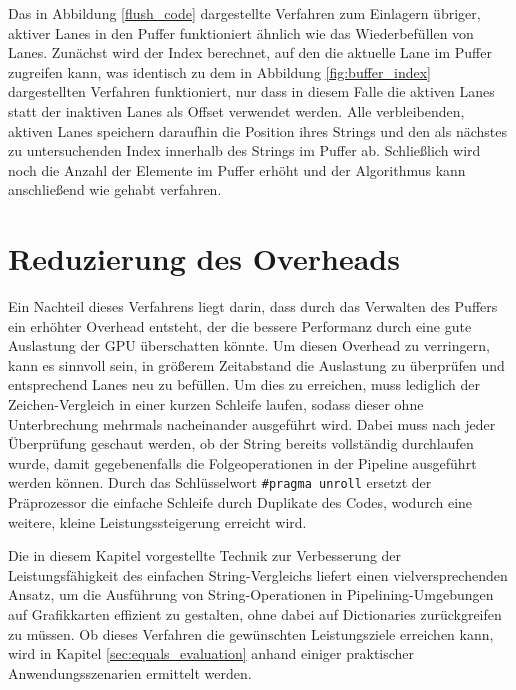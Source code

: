 Das in Abbildung \ref{flush_code} dargestellte Verfahren zum Einlagern übriger, aktiver Lanes in den Puffer funktioniert ähnlich wie das Wiederbefüllen von Lanes.
Zunächst wird der Index berechnet, auf den die aktuelle Lane im Puffer zugreifen kann, was identisch zu dem in Abbildung \ref{fig:buffer_index} dargestellten Verfahren funktioniert, nur dass in diesem Falle die aktiven Lanes statt der inaktiven Lanes als Offset verwendet werden.
Alle verbleibenden, aktiven Lanes speichern daraufhin die Position ihres Strings und den als nächstes zu untersuchenden Index innerhalb des Strings im Puffer ab.
Schließlich wird noch die Anzahl der Elemente im Puffer erhöht und der Algorithmus kann anschließend wie gehabt verfahren.

\section{Reduzierung des Overheads}
\label{sec:unroll}

Ein Nachteil dieses Verfahrens liegt darin, dass durch das Verwalten des Puffers ein erhöhter Overhead entsteht, der die bessere Performanz durch eine gute Auslastung der GPU überschatten könnte.
Um diesen Overhead zu verringern, kann es sinnvoll sein, in größerem Zeitabstand die Auslastung zu überprüfen und entsprechend Lanes neu zu befüllen.
Um dies zu erreichen, muss lediglich der Zeichen-Vergleich in einer kurzen Schleife laufen, sodass dieser ohne Unterbrechung mehrmals nacheinander ausgeführt wird.
Dabei muss nach jeder Überprüfung geschaut werden, ob der String bereits vollständig durchlaufen wurde, damit gegebenenfalls die Folgeoperationen in der Pipeline ausgeführt werden können.
Durch das Schlüsselwort \texttt{\#pragma unroll} ersetzt der Präprozessor die einfache Schleife durch Duplikate des Codes, wodurch eine weitere, kleine Leistungssteigerung erreicht wird.

Die in diesem Kapitel vorgestellte Technik zur Verbesserung der Leistungsfähigkeit des einfachen String-Vergleichs liefert einen vielversprechenden Ansatz, um die Ausführung von String-Operationen in Pipelining-Umgebungen auf Grafikkarten effizient zu gestalten, ohne dabei auf Dictionaries zurückgreifen zu müssen.
Ob dieses Verfahren die gewünschten Leistungsziele erreichen kann, wird in Kapitel \ref{sec:equals_evaluation} anhand einiger praktischer Anwendungsszenarien ermittelt werden.